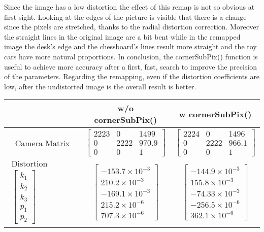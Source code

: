 \documentclass[11pt,a4paper]{article}
\newcommand{\cc}{\fontfamily{txtt}\selectfont}
\begin{document}
Since the image has a low distortion the effect of this remap is not so obvious at first sight.
Looking at the edges of the picture is visible that there is a change since the pixels are stretched, thanks to the radial distortion correction.
Moreover the straight lines in the original image are a bit bent while in the remapped image the desk's edge and the chessboard's lines result more straight and the toy cars have more natural proportions.
In conclusion, the {\cc cornerSubPix()} function is useful to achieve more accuracy after a first, fast, search to improve the precision of the parameters.
Regarding the remapping, even if the distortion coefficients are low, after the undistorted image is  the overall result is better.
\begin{center}
  \begin{table}[ht]
    \centering
    \begin{tabular}{|c | c c|}
      \hline
      & w/o {\cc cornerSubPix()} & w {\cc cornerSubPix()}\\
      \hline
      \hline
      Camera Matrix & 
      $ \begin{bmatrix} 2223& 0& 1499\\
        0& 2222& 970.9\\
        0& 0& 1\end{bmatrix}$ & 
        $ \begin{bmatrix} 2224& 0& 1496\\
          0& 2222& 966.1\\
          0& 0& 1 \end{bmatrix}$  \\
     \hline
     $\begin{matrix}
     \text{Distortion Coefficients}\\ \begin{bmatrix}k_1\\ k_2\\ k_3\\ p_1\\ p_2 \end{bmatrix} 
     \end{matrix}$ & 
    $\begin{bmatrix} -153.7\times 10^{-3}\\ 210.2\times 10^{-3}\\ -169.1\times 10^{-3}\\ 215.2\times 10^{-6}\\ 707.3\times 10^{-6}\end{bmatrix}$ &
     $\begin{bmatrix} -144.9\times 10^{-3}\\ 155.8\times 10^{-3}\\ -74.33\times 10^{-3}\\ -256.5\times 10^{-6}\\362.1\times 10^{-6} \end{bmatrix}$ \\

\end{tabular}
\end{table}
\end{center}
\end{document}
